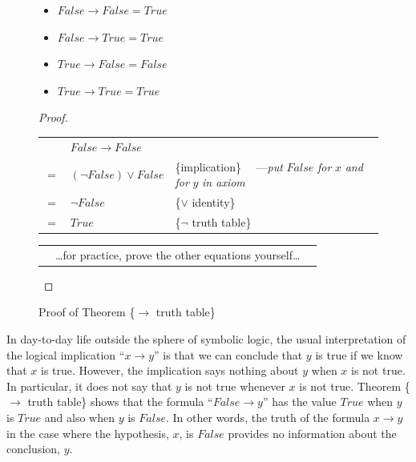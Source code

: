 \begin{figure}
\begin{theorem}
\mbox{}
\begin{itemize}
\item $False \rightarrow False = True$
\item $False \rightarrow True  = True$
\item $True  \rightarrow False = False$
\item $True  \rightarrow True  = True$
\end{itemize}
\end{theorem}

\begin{proof}
\mbox{} \\
\begin{tabular}{llp{3.15in}}
    & $False \rightarrow False$        & \\
$=$ & $(\neg False) \vee False$        & \{implication\} ~~---\emph{put} $False$ \emph{for} $x$ \emph{and for} $y$ \emph{in axiom}\\
$=$ & $\neg False$                     & \{$\vee$ identity\}\\
$=$ & $True$                           & \{$\neg$ truth table\}\\
\end{tabular}

\begin{tabular}{lll}
& \dots for practice, prove the other equations yourself\dots & \\
\end{tabular}

\end{proof}
\caption{Proof of Theorem \{$\rightarrow$ truth table\}}
\label{implication-truth-table}
\end{figure}

In day-to-day life outside the sphere of symbolic logic,
the usual interpretation of the logical implication ``$x \rightarrow y$''
is that we can conclude that $y$ is true if we know that
$x$ is true. However, the implication says nothing
about $y$ when $x$ is not true. In particular, it
does not say that $y$ is not true whenever $x$ is not true.
Theorem \{$\rightarrow$ truth table\} shows that the
formula ``$False \rightarrow y$'' has the value $True$ when $y$ is $True$
and also when $y$ is $False$.
In other words, the truth of the formula $x \rightarrow y$ in the case
where the hypothesis, $x$, is $False$ provides
no information about the conclusion, $y$.

